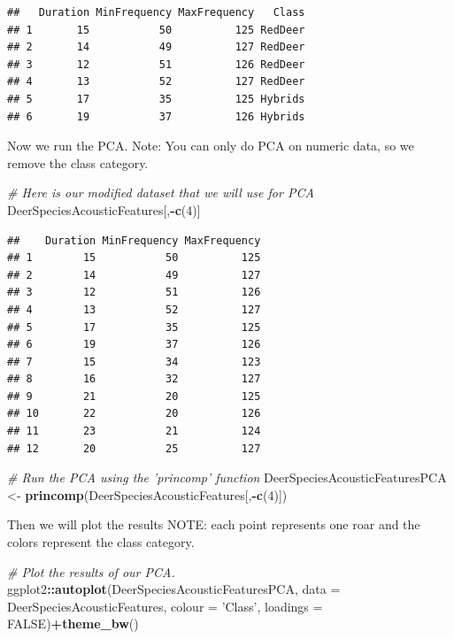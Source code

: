 \documentclass[]{book}
\newenvironment{Shaded}{\begin{snugshade}}{\end{snugshade}}
\newcommand{\CommentTok}[1]{\textcolor[rgb]{0.56,0.35,0.01}{\textit{#1}}}
\newcommand{\DataTypeTok}[1]{\textcolor[rgb]{0.13,0.29,0.53}{#1}}
\newcommand{\DecValTok}[1]{\textcolor[rgb]{0.00,0.00,0.81}{#1}}
\newcommand{\KeywordTok}[1]{\textcolor[rgb]{0.13,0.29,0.53}{\textbf{#1}}}
\newcommand{\NormalTok}[1]{#1}
\newcommand{\OperatorTok}[1]{\textcolor[rgb]{0.81,0.36,0.00}{\textbf{#1}}}
\newcommand{\OtherTok}[1]{\textcolor[rgb]{0.56,0.35,0.01}{#1}}
\newcommand{\StringTok}[1]{\textcolor[rgb]{0.31,0.60,0.02}{#1}}
\begin{document}
\begin{verbatim}
##   Duration MinFrequency MaxFrequency   Class
## 1       15           50          125 RedDeer
## 2       14           49          127 RedDeer
## 3       12           51          126 RedDeer
## 4       13           52          127 RedDeer
## 5       17           35          125 Hybrids
## 6       19           37          126 Hybrids
\end{verbatim}

Now we run the PCA. Note: You can only do PCA on numeric data, so we remove the class category.

\begin{Shaded}
\begin{Highlighting}[]
\CommentTok{# Here is our modified dataset that we will use for PCA}
\NormalTok{DeerSpeciesAcousticFeatures[,}\OperatorTok{-}\KeywordTok{c}\NormalTok{(}\DecValTok{4}\NormalTok{)] }
\end{Highlighting}
\end{Shaded}

\begin{verbatim}
##    Duration MinFrequency MaxFrequency
## 1        15           50          125
## 2        14           49          127
## 3        12           51          126
## 4        13           52          127
## 5        17           35          125
## 6        19           37          126
## 7        15           34          123
## 8        16           32          127
## 9        21           20          125
## 10       22           20          126
## 11       23           21          124
## 12       20           25          127
\end{verbatim}

\begin{Shaded}
\begin{Highlighting}[]
\CommentTok{# Run the PCA using the 'princomp' function}
\NormalTok{DeerSpeciesAcousticFeaturesPCA <-}\StringTok{ }\KeywordTok{princomp}\NormalTok{(DeerSpeciesAcousticFeatures[,}\OperatorTok{-}\KeywordTok{c}\NormalTok{(}\DecValTok{4}\NormalTok{)])}
\end{Highlighting}
\end{Shaded}

Then we will plot the results
NOTE: each point represents one roar and the colors represent the class category.

\begin{Shaded}
\begin{Highlighting}[]
\CommentTok{# Plot the results of our PCA.}
\NormalTok{ggplot2}\OperatorTok{::}\KeywordTok{autoplot}\NormalTok{(DeerSpeciesAcousticFeaturesPCA, }\DataTypeTok{data =}\NormalTok{ DeerSpeciesAcousticFeatures, }\DataTypeTok{colour =} \StringTok{'Class'}\NormalTok{,}
         \DataTypeTok{loadings =} \OtherTok{FALSE}\NormalTok{)}\OperatorTok{+}\KeywordTok{theme_bw}\NormalTok{()}
\end{Highlighting}
\end{Shaded}
\end{document}
